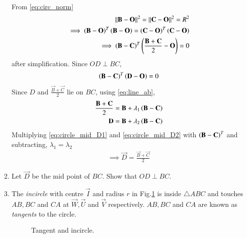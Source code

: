 \begin{enumerate}[label=\arabic*.,ref=\thesubsection.\theenumi]
\solution From \eqref{eq:circ_norm}
\begin{align}
\left\lVert\mathbf{B}-\mathbf{O}\right\rVert^2=\left\lVert\mathbf{C}-\mathbf{O}\right\rVert^2=R^2
\\
 \implies \left(\mathbf{B}-\mathbf{O}\right)^T\left(\mathbf{B}-\mathbf{O}\right) = 
\left(\mathbf{C}-\mathbf{O}\right)^T\left(\mathbf{C}-\mathbf{O}\right) 
\\
 \implies \left(\mathbf{B}-\mathbf{C}\right)^T\left(\frac{\mathbf{B}+\mathbf{C}}{2} - 
\mathbf{O}\right)  = 0
\label{eq:circle_mid}
\end{align}
after simplification. Since $OD \perp BC$,
\begin{align}
\left(\mathbf{B}-\mathbf{C}\right)^T\left(\mathbf{D}-\mathbf{O}\right) = 0 
\label{eq:circle_D}
\end{align}
Since $D$ and $\frac{\vec{B}+\vec{C}}{2}$ lie on $BC$, using 
\eqref{eq:line_ab},
\begin{align}
\label{eq:circle_mid_D1}
\frac{\mathbf{B}+\mathbf{C}}{2}
&= \mathbf{B}+ \lambda_1\left(\mathbf{B}-\mathbf{C}\right)
\\
\mathbf{D}
&= \mathbf{B}+ \lambda_2\left(\mathbf{B}-\mathbf{C}\right)
\label{eq:circle_mid_D2}
\end{align}
Multiplying \eqref{eq:circle_mid_D1} and \eqref{eq:circle_mid_D2} with 
$\left(\mathbf{B}-\mathbf{C}\right)^T$ and subtracting, $\lambda_1=\lambda_2$
%
\begin{align}
\implies \vec{D} = \frac{\vec{B}+\vec{C}}{2}
\label{eq:circle_bisect}
\end{align}
%
\item Let  $\vec{D}$ be the mid point of $BC$.  Show that $OD \perp BC$.
%
\item The {\em incircle} with centre $\vec{I}$ and radius $r$ in Fig.\ref{fig:ang_bisect}	
 is inside 
$\triangle ABC$ and touches $AB, BC$ 
and $CA$ at $\vec{W}, \vec{U}$ and $\vec{V}$ respectively. $AB, BC$ and 
$CA$ are known as {\em tangents} to the circle.
\begin{figure}[!ht]
	\begin{center}
		
		\resizebox{\columnwidth}{!}{}
	\end{center}
	\caption{Tangent and incircle.}
	\label{fig:ang_bisect}	
\end{figure}



\end{enumerate}
